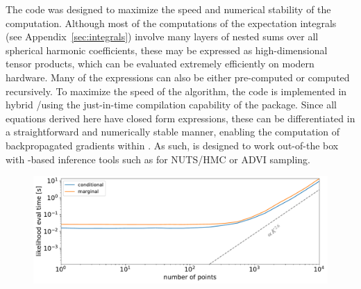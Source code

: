 \documentclass[modern]{aastex62}
\begin{document}
The code was designed to maximize the speed and numerical stability of the
computation. Although most of the computations of the expectation integrals
(see Appendix~\ref{sec:integrals}) involve many layers of nested sums over
all spherical harmonic coefficients, these may be expressed as high-dimensional
tensor products, which can be evaluated extremely efficiently on modern
hardware. Many of the expressions can also be either pre-computed or
computed recursively. To maximize the speed of the algorithm, the code is
implemented in hybrid \cpp/\Python using the just-in-time compilation
capability of the \theano package. Since all equations derived here
have closed form expressions, these can be differentiated in a straightforward
and numerically stable manner, enabling the computation of backpropagated
gradients within \theano. As such, \starryprocess is designed to work
out-of-the box with \theano-based inference tools such as \pymcthree
for NUTS/HMC or ADVI sampling.

\begin{figure}[t!]
    \begin{centering}
        \includegraphics[width=\linewidth]{figures/speed.pdf}
    \end{centering}
\end{figure}
\end{document}
